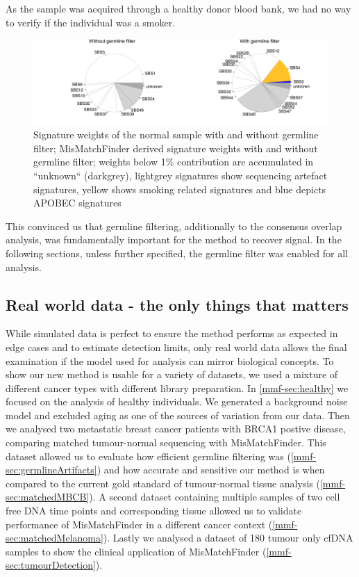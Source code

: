 As the sample was acquired through a healthy donor blood bank, we had no way to verify if the individual was a smoker.

\begin{figure}[ht]
\centering
\includegraphics[width=.99\linewidth]{Figures/MisMatchFinder/noGermlineFilterSignaturesPieChart.pdf}
\caption[Signature weights of the normal sample with and without germline filter]{Signature weights of the normal sample with and without germline filter; MisMatchFinder derived signature weights with and without germline filter; weights below 1\% contribution are accumulated in ``unknown`` (darkgrey), lightgrey signatures show sequencing artefact signatures, yellow shows smoking related signatures and blue depicts APOBEC signatures}\label{fig:mmf-noGermlinePie}
\end{figure}
 
This convinced us that germline filtering, additionally to the consensus overlap analysis, was fundamentally important for the method to recover signal. In the following sections, unless further specified, the germline filter was enabled for all analysis.


\subsection{Real world data - the only things that matters}
\label{mmf-sec:realworld}

While simulated data is perfect to ensure the method performs as expected in edge cases and to estimate detection limits, only real world data allows the final examination if the model used for analysis can mirror biological concepts. To show our new method is usable for a variety of datasets, we used a mixture of different cancer types with different library preparation. In \autoref{mmf-sec:healthy} we focused on the analysis of healthy individuals. We generated a background noise model and excluded aging as one of the sources of variation from our data. Then we analysed two metastatic breast cancer patients with BRCA1 postive disease, comparing matched tumour-normal sequencing with MisMatchFinder. This dataset allowed us to evaluate how efficient germline filtering was (\autoref{mmf-sec:germlineArtifacts}) and how accurate and sensitive our method is when compared to the current gold standard of tumour-normal tissue analysis (\autoref{mmf-sec:matchedMBCB}).
A second dataset containing  multiple samples of two cell free DNA time points and corresponding tissue allowed us to validate performance of MisMatchFinder in a different cancer context (\autoref{mmf-sec:matchedMelanoma}). Lastly we analysed a dataset of 180  tumour only cfDNA samples to show the clinical application of MisMatchFinder (\autoref{mmf-sec:tumourDetection}).

